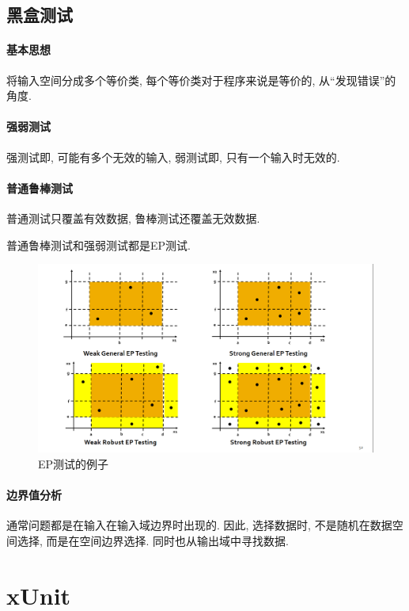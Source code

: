 \documentclass{ctexart}
\begin{document}
\subsection{黑盒测试}
\paragraph{基本思想} 将输入空间分成多个等价类, 每个等价类对于程序来说是等价的, 从``发现错误''的角度.
\paragraph{强弱测试} 强测试即, 可能有多个无效的输入, 弱测试即, 只有一个输入时无效的.
\paragraph{普通鲁棒测试} 普通测试只覆盖有效数据, 鲁棒测试还覆盖无效数据.\par
    普通鲁棒测试和强弱测试都是EP测试.
    \begin{figure}[ht!]
        \centering
        \includegraphics[width=\textwidth, height=\textheight, keepaspectratio]{eptest.png}
        \caption{EP测试的例子}
    \end{figure}

\paragraph{边界值分析} 通常问题都是在输入在输入域边界时出现的.
    因此, 选择数据时, 不是随机在数据空间选择, 而是在空间边界选择.
    同时也从输出域中寻找数据.\par


\section{xUnit}
\end{document}
